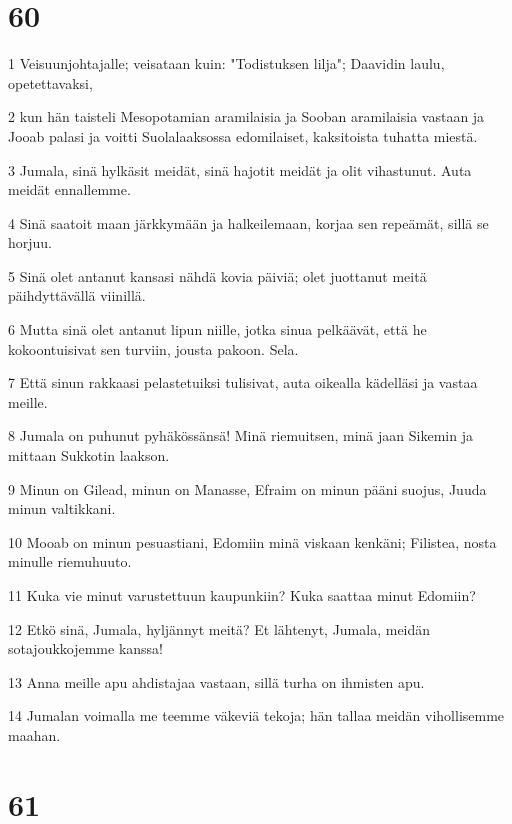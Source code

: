 \chapter{60}

\par 1 Veisuunjohtajalle; veisataan kuin: "Todistuksen lilja"; Daavidin laulu, opetettavaksi,
\par 2 kun hän taisteli Mesopotamian aramilaisia ja Sooban aramilaisia vastaan ja Jooab palasi ja voitti Suolalaaksossa edomilaiset, kaksitoista tuhatta miestä.
\par 3 Jumala, sinä hylkäsit meidät, sinä hajotit meidät ja olit vihastunut. Auta meidät ennallemme.
\par 4 Sinä saatoit maan järkkymään ja halkeilemaan, korjaa sen repeämät, sillä se horjuu.
\par 5 Sinä olet antanut kansasi nähdä kovia päiviä; olet juottanut meitä päihdyttävällä viinillä.
\par 6 Mutta sinä olet antanut lipun niille, jotka sinua pelkäävät, että he kokoontuisivat sen turviin, jousta pakoon. Sela.
\par 7 Että sinun rakkaasi pelastetuiksi tulisivat, auta oikealla kädelläsi ja vastaa meille.
\par 8 Jumala on puhunut pyhäkössänsä! Minä riemuitsen, minä jaan Sikemin ja mittaan Sukkotin laakson.
\par 9 Minun on Gilead, minun on Manasse, Efraim on minun pääni suojus, Juuda minun valtikkani.
\par 10 Mooab on minun pesuastiani, Edomiin minä viskaan kenkäni; Filistea, nosta minulle riemuhuuto.
\par 11 Kuka vie minut varustettuun kaupunkiin? Kuka saattaa minut Edomiin?
\par 12 Etkö sinä, Jumala, hyljännyt meitä? Et lähtenyt, Jumala, meidän sotajoukkojemme kanssa!
\par 13 Anna meille apu ahdistajaa vastaan, sillä turha on ihmisten apu.
\par 14 Jumalan voimalla me teemme väkeviä tekoja; hän tallaa meidän vihollisemme maahan.

\chapter{61}

